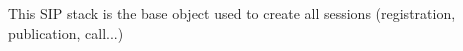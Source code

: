 This S\-I\-P stack is the base object used to create all sessions (registration, publication, call...) 
